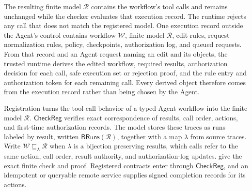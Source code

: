 The resulting finite model \(\mathcal R\) contains the workflow's tool calls and remains unchanged while the checker evaluates that execution record.
The runtime rejects any call that does not match the registered model.
One execution record outside the Agent's control contains workflow \(\mathcal W\), finite model \(\mathcal R\), edit rules, request-normalization rules, policy, checkpoints, authorization log, and queued requests.
From that record and an Agent request naming an edit and its objects, the trusted runtime derives the edited workflow, required results, authorization decision for each call, safe execution set or rejection proof, and the rule entry and authorization token for each remaining call.
Every derived object therefore comes from the execution record rather than being chosen by the Agent.

Registration turns the tool-call behavior of a typed Agent workflow into the finite model \(\mathcal R\).
\(\mathsf{CheckReg}\) verifies exact correspondence of results, call order, actions, and first-time authorization records.
The model stores these traces as runs labeled by result, written \(\mathsf{BRuns}(\mathcal R)\), together with a map \(\lambda\) from source traces.
Write \(\mathcal W\sqsubseteq_\lambda\mathcal R\) when \(\lambda\) is a bijection preserving results, which calls refer to the same action, call order, result authority, and authorization-log updates.
 give the exact finite check and proof.
Registered contracts enter through \(\mathsf{CheckReg}\), and an idempotent or queryable remote service supplies signed completion records for its actions.

